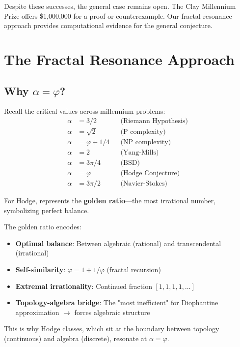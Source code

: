\begin{remark}[Status]
Despite these successes, the general case remains open. The Clay Millennium Prize offers \$1,000,000 for a proof or counterexample. Our fractal resonance approach provides computational evidence for the general conjecture.
\end{remark}

\section{The Fractal Resonance Approach}

\subsection{Why $\alpha = \varphi$?}

Recall the critical values across millennium problems:
\begin{align}
\alpha &= 3/2 && \text{(Riemann Hypothesis)} \\
\alpha &= \sqrt{2} && \text{(P complexity)} \\
\alpha &= \varphi + 1/4 && \text{(NP complexity)} \\
\alpha &= 2 && \text{(Yang-Mills)} \\
\alpha &= 3\pi/4 && \text{(BSD)} \\
\alpha &= \varphi && \text{(Hodge Conjecture)} \\
\alpha &= 3\pi/2 && \text{(Navier-Stokes)}
\end{align}

For Hodge,  represents the \textbf{golden ratio}—the most irrational number, symbolizing perfect balance.

\begin{keyidea}
The golden ratio encodes:
\begin{itemize}
\item \textbf{Optimal balance}: Between algebraic (rational) and transcendental (irrational)
\item \textbf{Self-similarity}: $\varphi = 1 + 1/\varphi$ (fractal recursion)
\item \textbf{Extremal irrationality}: Continued fraction $[1, 1, 1, 1, \ldots]$
\item \textbf{Topology-algebra bridge}: The "most inefficient" for Diophantine approximation $\to$ forces algebraic structure
\end{itemize}

This is why Hodge classes, which sit at the boundary between topology (continuous) and algebra (discrete), resonate at $\alpha = \varphi$.
\end{keyidea}

